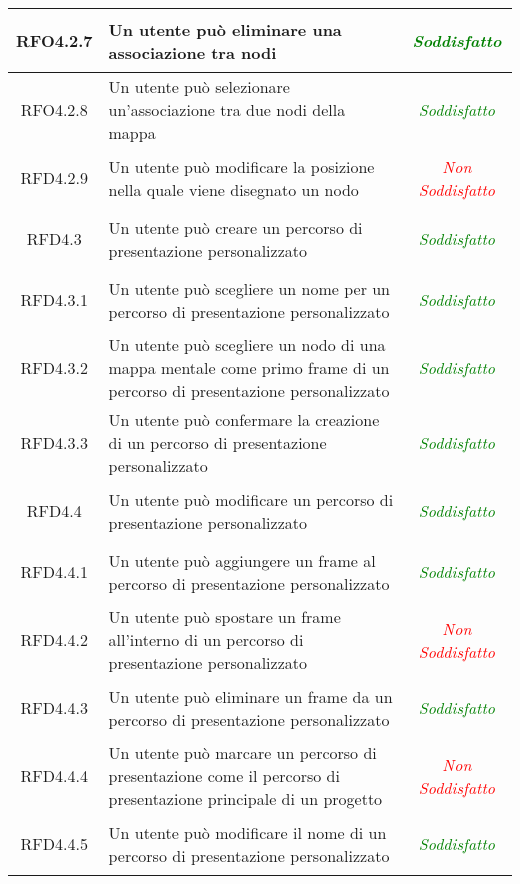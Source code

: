 \begin{longtable}{|c|>{\centering}m{7cm}|c|}
\hypertarget{RFO4.2.7}{RFO4.2.7} & Un utente può eliminare una associazione tra nodi & \textcolor{Green}{\textit{Soddisfatto}}\\ \hline
\hypertarget{RFO4.2.8}{RFO4.2.8} & Un utente può selezionare un'associazione tra due nodi della mappa & \textcolor{Green}{\textit{Soddisfatto}}\\ \hline
\hypertarget{RFD4.2.9}{RFD4.2.9} & Un utente può modificare la posizione nella quale viene disegnato un nodo & \textcolor{Red}{\textit{Non Soddisfatto}}\\ \hline
\hypertarget{RFD4.3}{RFD4.3} & Un utente può creare un percorso di presentazione personalizzato & \textcolor{Green}{\textit{Soddisfatto}}\\ \hline
\hypertarget{RFD4.3.1}{RFD4.3.1} & Un utente può scegliere un nome per un percorso di presentazione personalizzato & \textcolor{Green}{\textit{Soddisfatto}}\\ \hline
\hypertarget{RFD4.3.2}{RFD4.3.2} & Un utente può scegliere un nodo di una mappa mentale come primo frame di un percorso di presentazione personalizzato & \textcolor{Green}{\textit{Soddisfatto}}\\ \hline
\hypertarget{RFD4.3.3}{RFD4.3.3} & Un utente può confermare la creazione di un percorso di presentazione personalizzato & \textcolor{Green}{\textit{Soddisfatto}}\\ \hline
\hypertarget{RFD4.4}{RFD4.4} & Un utente può modificare un percorso di presentazione personalizzato & \textcolor{Green}{\textit{Soddisfatto}}\\ \hline
\hypertarget{RFD4.4.1}{RFD4.4.1} & Un utente può aggiungere un frame al percorso di presentazione personalizzato & \textcolor{Green}{\textit{Soddisfatto}}\\ \hline
\hypertarget{RFD4.4.2}{RFD4.4.2} & Un utente può spostare un frame all'interno di un percorso di presentazione personalizzato & \textcolor{Red}{\textit{Non Soddisfatto}}\\ \hline
\hypertarget{RFD4.4.3}{RFD4.4.3} & Un utente può eliminare un frame da un percorso di presentazione personalizzato & \textcolor{Green}{\textit{Soddisfatto}}\\ \hline
\hypertarget{RFD4.4.4}{RFD4.4.4} & Un utente può marcare un percorso di presentazione come il percorso di presentazione principale di un progetto & \textcolor{Red}{\textit{Non Soddisfatto}}\\ \hline
\hypertarget{RFD4.4.5}{RFD4.4.5} & Un utente può modificare il nome di un percorso di presentazione personalizzato & \textcolor{Green}{\textit{Soddisfatto}}\\ \hline

\end{longtable}
